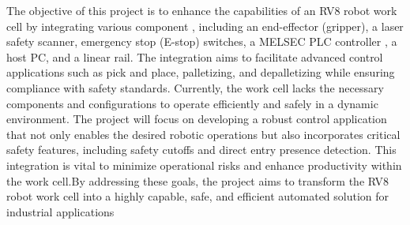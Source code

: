 The objective of this project is to enhance the capabilities of an RV8 robot work cell by integrating various component
, including an end-effector (gripper), a laser safety scanner, emergency stop (E-stop) switches, a MELSEC PLC controller
, a host PC, and a linear rail. The integration aims to facilitate advanced control applications such as pick and place,
palletizing, and depalletizing while ensuring compliance with safety standards.
Currently, the work cell lacks the necessary components and configurations to operate efficiently and safely in a
dynamic environment. The project will focus on developing a robust control application that not only enables the desired
robotic operations but also incorporates critical safety features, including safety cutoffs and direct entry presence
detection. This integration is vital to minimize operational risks and enhance productivity within the work cell.By
addressing these goals, the project aims to transform the RV8 robot work cell into a highly capable, safe, and efficient
automated solution for industrial applications